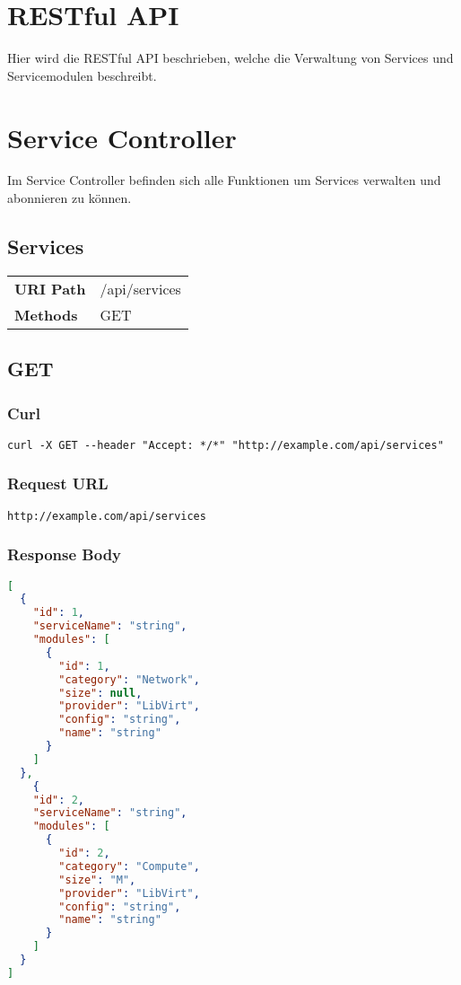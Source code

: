 \section{RESTful API}
Hier wird die RESTful API beschrieben, welche die Verwaltung von Services und 
Servicemodulen beschreibt.
\section{Service Controller}
Im Service Controller befinden sich alle Funktionen um Services verwalten und abonnieren zu können.
\subsection{Services}
\begin{tabularx}{\linewidth}{l l}
\textbf{URI Path} & /api/services\\
\textbf{Methods} & GET\\
\end{tabularx}

\subsection{GET}
\subsubsection{Curl}
\begin{lstlisting}[style=Bash] 
curl -X GET --header "Accept: */*" "http://example.com/api/services"
\end{lstlisting}
\subsubsection{Request URL}
\begin{lstlisting}[] 
http://example.com/api/services
\end{lstlisting}
\subsubsection{Response Body}
\begin{lstlisting}[language=json] 
[
  {
    "id": 1,
    "serviceName": "string",
    "modules": [
      {
        "id": 1,
        "category": "Network",
        "size": null,
        "provider": "LibVirt",
        "config": "string",
        "name": "string"
      }
    ]
  },
    {
    "id": 2,
    "serviceName": "string",
    "modules": [
      {
        "id": 2,
        "category": "Compute",
        "size": "M",
        "provider": "LibVirt",
        "config": "string",
        "name": "string"
      }
    ]
  }
]
\end{lstlisting}

